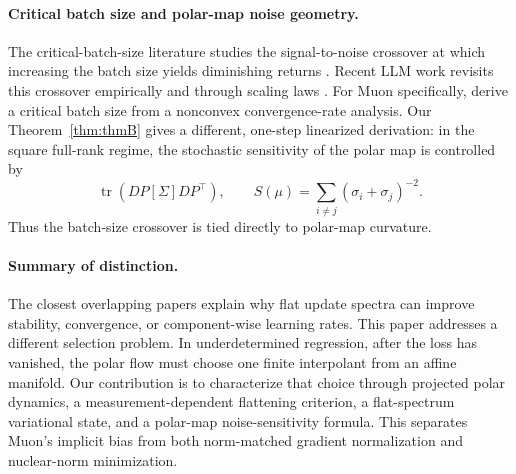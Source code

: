 \documentclass{article}
\begin{document}
\paragraph{Critical batch size and polar-map noise geometry.}
The critical-batch-size literature studies the signal-to-noise crossover at which increasing the batch size yields diminishing returns \citep{mccandlish2018empirical,smith2018dont}. Recent LLM work revisits this crossover empirically and through scaling laws \citep{zhang2024cbs,merrill2025cbs}. For Muon specifically, \citep{sato2025cbs} derive a critical batch size from a nonconvex convergence-rate analysis. Our Theorem~\ref{thm:thmB} gives a different, one-step linearized derivation: in the square full-rank regime, the stochastic sensitivity of the polar map is controlled by
\[
        \operatorname{tr}\!\left(DP[\Sigma]DP^\top\right),
        \qquad
        S(\mu)=\sum_{i\neq j}(\sigma_i+\sigma_j)^{-2}.
\]
Thus the batch-size crossover is tied directly to polar-map curvature. 

\paragraph{Summary of distinction.}
The closest overlapping papers explain why flat update spectra can improve stability, convergence, or component-wise learning rates. This paper addresses a different selection problem. In underdetermined regression, after the loss has vanished, the polar flow must choose one finite interpolant from an affine manifold. Our contribution is to characterize that choice through projected polar dynamics, a measurement-dependent flattening criterion, a flat-spectrum variational state, and a polar-map noise-sensitivity formula. This separates Muon's implicit bias from both norm-matched gradient normalization and nuclear-norm minimization.


\end{document}
